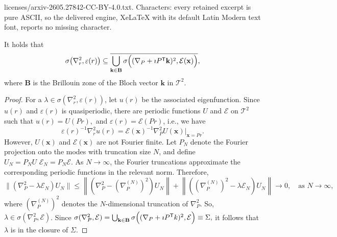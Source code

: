 \documentclass[10pt,a4paper]{amsart}
\def\k{\mathbf{k}}
\def\x{\mathbf{x}}
\begin{document}
licenses/arxiv-2605.27842-CC-BY-4.0.txt. Characters: every retained excerpt is pure ASCII, so the delivered engine, XeLaTeX with its default Latin Modern text font, reports no missing character.
\begin{thm} \label{thm: inclusion relation}
It holds that
\begin{equation}\label{set: spectrum including}
\sigma\bigl(\nabla_r^2,\varepsilon(r)\bigr)
\subseteq
\overline{
\bigcup_{\k \in \mathbf{B}}
\sigma\Bigl( (\nabla_P + \imath P^\mathsf{T} \k)^2, \mathcal{E}(\x) \Bigr)
},
\end{equation}
where \(\mathbf{B}\) is the Brillouin zone of the Bloch vector $\k$ in \(\mathcal{T}^2\).
\end{thm}

\begin{proof}
For a $\lambda \in \sigma(\nabla_r^2,\varepsilon(r))$, let $u(r)$ be the associated eigenfunction.  Since $u(r)$ and $\varepsilon(r)$ is quasiperiodic, there are periodic functions $U$ and $\mathcal{E}$ on \(\mathcal{T}^2\) such that $ u(r) = U(Pr),$ and $\varepsilon(r) = \mathcal{E}(Pr)$, i.e., we have
\begin{equation}\label{eq: infinite projection}
\varepsilon(r)^{-1} \nabla_r^2 u(r)
=
\mathcal{E}(\x)^{-1} \nabla_P^2 U(\x)\big|_{\x=Pr}.
\end{equation}
However, $U(\x)$ and $\mathcal{E}(\x)$ are not Fourier finite. Let $P_N$ denote the Fourier projection onto the modes with truncation size $N$, and define $U_N = P_N U  \,\, \mathcal{E}_N = P_N \mathcal{E}$. As $N\to\infty$, the Fourier truncations approximate the corresponding periodic functions in the relevant norm. Therefore,
\begin{equation}\label{dv: spectral trunc est}
\bigl\| (\nabla_P^2 - \lambda \mathcal{E}_N) U_N \bigr\| \leq \left\|\left(
\nabla_P^2 - \left(\nabla_P^{(N)}\right)^2
\right)U_N\right\| +
\left\|\left(
\left(\nabla_P^{(N)}\right)^2 - \lambda \mathcal{E}_N
\right)U_N\right\|
\to 0,
\quad \text{as } N \to \infty,
\end{equation}
where $\left(\nabla_P^{(N)}\right)^2$ denotes the $N$-dimensional truncation of $\nabla_P^2$. So, $\lambda \in \sigma(\nabla_P^2,\mathcal{E})$. Since $ \sigma(\nabla_P^2,\mathcal{E}) = \bigcup_{\k \in \mathbf{B}} \sigma\Bigl( (\nabla_P + \imath P^\mathsf{T} k)^2, \mathcal{E} \Bigr)\equiv \Sigma, $ it follows that $\lambda$ is in the closure of $\Sigma$.
\end{proof}
\end{document}
